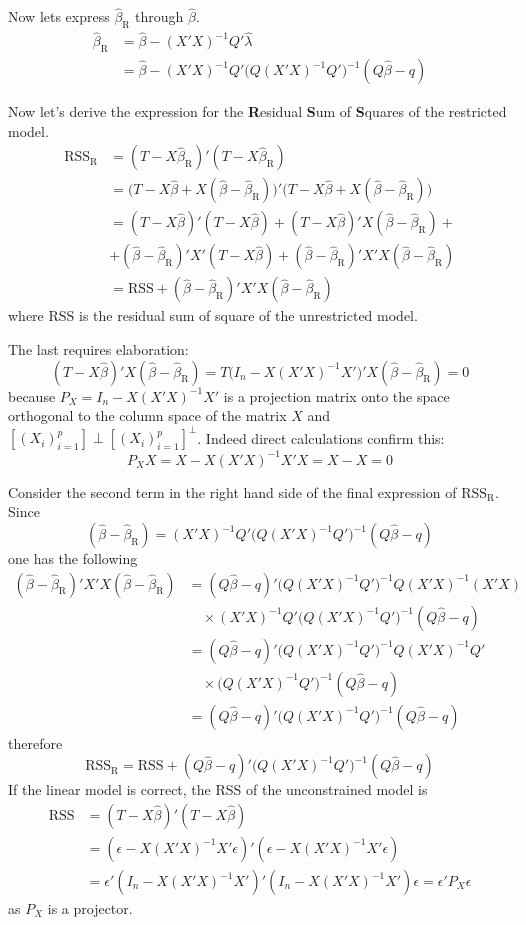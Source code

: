 \documentclass[a4paper]{article}
\newcommand{\clo}[1]{{\left [ #1 \right ]}}
\newcommand{\R}{\text{R}}
\newcommand{\RSS}{\text{RSS}}
\begin{document}
Now lets express $\hat{\beta}_\R$ through $\hat{\beta}$.
\begin{align*}
	\hat{\beta}_\R
	&= \hat{\beta} - (X'X)^{-1}Q'\hat{\lambda} \\
	&= \hat{\beta} - (X'X)^{-1}Q'\big(Q(X'X)^{-1}Q'\big)^{-1}(Q\hat{\beta}-q)
\end{align*}

Now let's derive the expression for the \textbf{R}esidual \textbf{S}um of \textbf{S}quares of the restricted model.
\begin{align*}
	\RSS_\R &= (T - X\hat{\beta}_\R)'(T - X\hat{\beta}_\R)\\
	&= \big(T - X\hat{\beta} + X (\hat{\beta} - \hat{\beta}_\R) \big)'\big(T - X\hat{\beta} + X (\hat{\beta} - \hat{\beta}_\R) \big)\\
	&= (T - X\hat{\beta})'(T - X\hat{\beta}) + (T - X\hat{\beta})'X (\hat{\beta} - \hat{\beta}_\R) + \\
	&+(\hat{\beta} - \hat{\beta}_\R)'X'(T - X\hat{\beta}) + (\hat{\beta} - \hat{\beta}_\R)'X'X(\hat{\beta} - \hat{\beta}_\R) \\
	&= \RSS + (\hat{\beta} - \hat{\beta}_\R)'X'X(\hat{\beta} - \hat{\beta}_\R)
\end{align*}
where $\RSS$ is the residual sum of square of the unrestricted model.

The last requires elaboration:
\[(T - X\hat{\beta})'X (\hat{\beta} - \hat{\beta}_\R) = T\big(I_n - X(X'X)^{-1}X'\big)'X (\hat{\beta} - \hat{\beta}_\R) = 0\]
because $P_X = I_n - X(X'X)^{-1}X'$ is a projection matrix onto the space orthogonal to the column space of the matrix $X$ and $\clo{(X_i)_{i=1}^p} \perp \clo{(X_i)_{i=1}^p}^\perp$. Indeed direct calculations confirm this:
\[P_X X = X - X(X'X)^{-1}X'X = X - X = 0\]

Consider the second term in the right hand side of the final expression of $\RSS_\R$. Since 
\[(\hat{\beta} - \hat{\beta}_\R) = (X'X)^{-1}Q'\big(Q(X'X)^{-1}Q'\big)^{-1}(Q\hat{\beta}-q)\]
one has the following
\begin{align*}
	(\hat{\beta} - \hat{\beta}_\R)'X'X(\hat{\beta} - \hat{\beta}_\R)
	&= (Q\hat{\beta}-q)'\big(Q(X'X)^{-1}Q'\big)^{-1}Q(X'X)^{-1} (X'X) \\
	&\quad\times (X'X)^{-1}Q'\big(Q(X'X)^{-1}Q'\big)^{-1}(Q\hat{\beta}-q)\\
	&= (Q\hat{\beta}-q)'\big(Q(X'X)^{-1}Q'\big)^{-1}Q(X'X)^{-1}Q' \\
	&\quad\times \big(Q(X'X)^{-1}Q'\big)^{-1}(Q\hat{\beta}-q)\\
	&= (Q\hat{\beta}-q)'\big(Q(X'X)^{-1}Q'\big)^{-1}(Q\hat{\beta}-q)
\end{align*}
therefore
\[\RSS_\R = \RSS + (Q\hat{\beta}-q)'\big(Q(X'X)^{-1}Q'\big)^{-1}(Q\hat{\beta}-q)\]
If the linear model is correct, the RSS of the unconstrained model is
\begin{align*}
	\RSS &= (T - X\hat{\beta})'(T - X\hat{\beta}) \\
	&= (\epsilon - X(X'X)^{-1}X'\epsilon)'(\epsilon - X(X'X)^{-1}X'\epsilon) \\
	&= \epsilon'(I_n - X(X'X)^{-1}X')'(I_n - X(X'X)^{-1}X')\epsilon = \epsilon'P_X \epsilon
\end{align*}
as $P_X$ is a projector.
\end{document}
